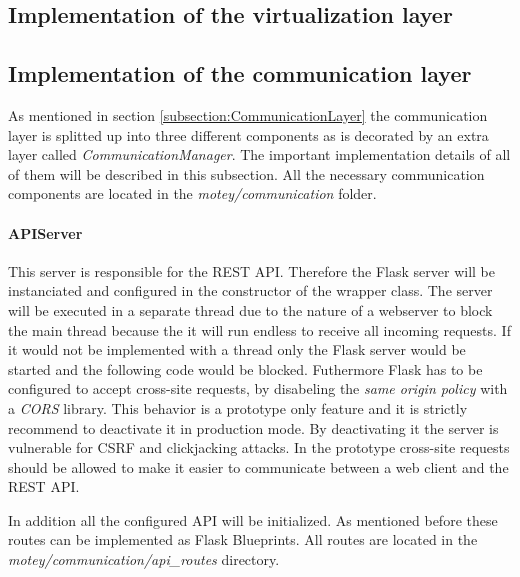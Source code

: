 \subsection{Implementation of the virtualization layer}
\doit

\subsection{Implementation of the communication layer}
\label{subsection:implementation-communication-layer}
As mentioned in section \ref{subsection:CommunicationLayer} the communication layer is splitted up into three different components as is decorated by an extra layer called \textit{CommunicationManager}.
The important implementation details of all of them will be described in this subsection.
All the necessary communication components are located in the \textit{motey/communication} folder.

\paragraph{APIServer} This server is responsible for the \ac{REST} \ac{API}.
Therefore the Flask server will be instanciated and configured in the constructor of the wrapper class.
The server will be executed in a separate thread due to the nature of a webserver to block the main thread because the it will run endless to receive all incoming requests.
If it would not be implemented with a thread only the Flask server would be started and the following code would be blocked.
Futhermore Flask has to be configured to accept cross-site requests, by disabeling the \textit{same origin policy} with a \textit{\ac{CORS}} library.
This behavior is a prototype only feature and it is strictly recommend to deactivate it in production mode.
By deactivating it the server is vulnerable for \ac{CSRF} and clickjacking attacks.
In the prototype cross-site requests should be allowed to make it easier to communicate between a web client and the \ac{REST} \ac{API}.

In addition all the configured \ac{API} will be initialized.
As mentioned before these routes can be implemented as Flask Blueprints.
All routes are located in the \textit{motey/communication/api\_routes} directory.


